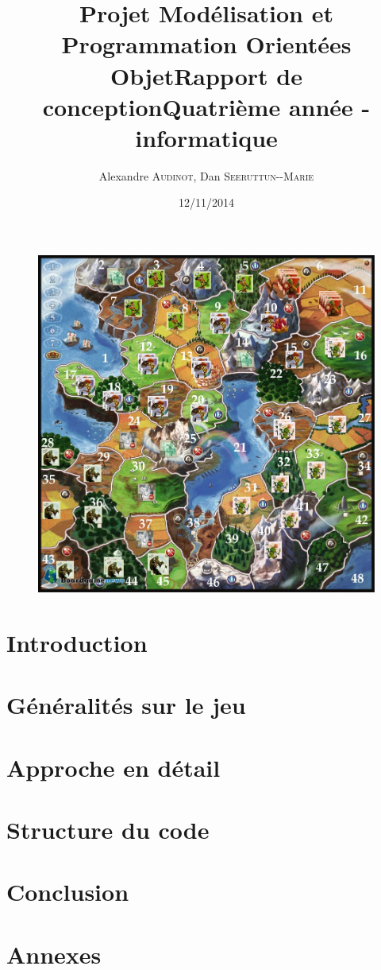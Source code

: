 \documentclass[12pt]{article}
\title{Projet Modélisation et Programmation Orientées Objet\smallbreak Rapport de conception\smallbreak Quatrième année - informatique }
\author{Alexandre \textsc{Audinot},  Dan \textsc{Seeruttun-{}-Marie}}
\date{12/11/2014}
\begin{document}
\maketitle

\begin{figure}[!h] 
\centerline{\includegraphics[scale=0.30]{img/cover.jpg}}
\end{figure}
\newpage

\newpage
\tableofcontents
\newpage
\newpage


\section{Introduction}

\newpage
\section{Généralités sur le jeu}

\newpage
\section{Approche en détail}

\newpage
\section{Structure du code}

\newpage
\section{Conclusion}

\section{Annexes}

\end{document}
